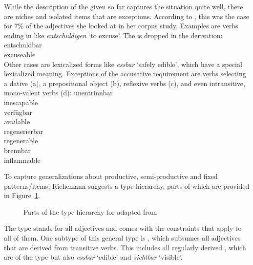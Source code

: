 \documentclass[output=paper,biblatex,babelshorthands,newtxmath,draftmode,colorlinks,citecolor=brown]{langscibook}
\begin{document}
While the description of the \bard given so far captures
the situation quite well, there are niches and isolated items that are exceptions. According to
\citet[]{Riehemann98a}, this was the case for 7\% of the adjectives she looked at in her
corpus study. Examples are verbs ending in  like \emph{entschuldigen} `to excuse'. The
 is dropped in the derivation:
\ea
\gll entschuldbar\\
     excuseable\\
\z
Other cases are lexicalized forms like \emph{essbar} `safely edible', which have a special
lexicalized meaning. Exceptions of the accusative requirement are verbs selecting a dative
(a), a prepositional object (b), reflexive verbs (c), and even intransitive, mono-valent verbs (d):
\eal
\ex
\gll unentrinnbar\\
     inescapable\\
\ex
\gll verfügbar\\
     available\\
\ex
\gll regenerierbar\\
     regenerable\\
\ex
\gll brennbar\\
     inflammable\\
\zl

\largerpage
To capture generalizations about productive, semi-productive and fixed patterns/items, Riehemann
suggests a type hierarchy, parts of which are provided in
Figure~\ref{fig-bar-Riehemann}.
\begin{figure}
\centerfit{%
\begin{forest}
type hierarchy
[bar-adj
  [trans-bar-adj
    [reg-bar-adj]
    [essbar]
    [\ldots]]
  [dative-bar-adj
    [unentrinnbar]
    [\ldots]]
  [prep-bar-adj
    [verfügbar]]
  [intr-bar-adj
    [brennbar]
    [\ldots]]]
\end{forest}}
\caption{\label{fig-bar-Riehemann}Parts of the type hierarchy for \bard adapted from }
\end{figure}
The type  stands for all  adjectives and comes with the constraints that
apply to all of them. One subtype of this general type is , which subsumes all
adjectives that are derived from transitive verbs. This includes all regularly derived \baradjs,
which are of the type  but also \emph{essbar} `edible' and \emph{sichtbar} `visible'.
\end{document}
